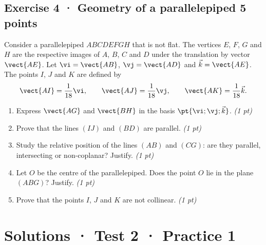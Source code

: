 \subsection*{Exercise 4 · Geometry of a parallelepiped \hfill 5 points}Consider a parallelepiped $ABCDEFGH$ that is not flat. The vertices $E$, $F$, $G$ and $H$ are the respective images of $A$, $B$, $C$ and $D$ under the translation by vector $\vect{AE}$.
Let $\vi=\vect{AB}$, $\vj=\vect{AD}$ and $\vec k=\vect{AE}$.
The points $I$, $J$ and $K$ are defined by
\[\vect{AI}=\frac1{18}\vi,\qquad\vect{AJ}=\frac1{18}\vj,\qquad\vect{AK}=\frac1{18}\vec k.\]

\begin{enumerate}

\item Express $\vect{AG}$ and $\vect{BH}$ in the basis $\pt{\vi;\vj;\vec k}$. \hfill\textit{(1 pt)}

\item Prove that the lines $(IJ)$ and $(BD)$ are parallel. \hfill\textit{(1 pt)}

\item Study the relative position of the lines $(AB)$ and $(CG)$: are they parallel, intersecting or non-coplanar? Justify. \hfill\textit{(1 pt)}

\item Let $O$ be the centre of the parallelepiped. Does the point $O$ lie in the plane $(ABG)$? Justify. \hfill\textit{(1 pt)}

\item Prove that the points $I$, $J$ and $K$ are not collinear. \hfill\textit{(1 pt)}

\end{enumerate}

\ifmxteacher\mxnewpage

\section*{Solutions · Test 2 · Practice 1}\label{cor:2-1}

